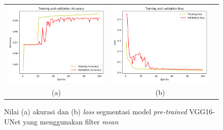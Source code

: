 \begin{enumerate}
	
	\begin{figure}[htbp]
		\centering
		\begin{tabular}{ccc}
			\includegraphics[scale=0.5]{bab4/acc-mean-vggunet.png} &
			\includegraphics[scale=0.5]{bab4/loss-mean-vggunet.png} & \\
			(a) & (b)    %
		\end{tabular}
		\caption{Nilai (a) akurasi dan (b) \textit{loss} segmentasi model \textit{pre-trained} VGG16-UNet yang menggunakan filter \textit{mean}}
		\label{fig:performance-mean-vggunet}
	\end{figure}
	

\end{enumerate}
